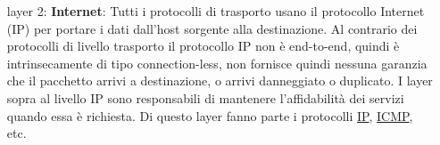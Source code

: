 \begin{enumerate}

    \item[layer 2:] \textbf{Internet}: Tutti i protocolli di trasporto usano il protocollo Internet (IP) per portare i dati dall'host sorgente alla destinazione. Al contrario dei protocolli di livello trasporto il protocollo IP non è end-to-end, quindi è intrinsecamente di tipo connection-less, non fornisce quindi nessuna garanzia che il pacchetto arrivi a destinazione, o arrivi danneggiato o duplicato. I layer sopra al livello IP sono responsabili di mantenere l'affidabilità dei servizi quando essa è richiesta. \newline 
    Di questo layer fanno parte i protocolli \href{https://en.wikipedia.org/wiki/Internet_Protocol}{IP}, \href{https://en.wikipedia.org/wiki/Internet_Control_Message_Protocol}{ICMP}, etc.
    


\end{enumerate}
